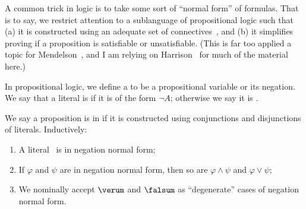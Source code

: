 \begin{node}\label{prop-000P}%
A common trick in logic is to take some sort of ``normal form'' of
formulas. That is to say, we restrict attention to a sublanguage of
propositional logic such that (a) it is constructed using an adequate
set of connectives~, and (b) it simplifies proving if a
proposition is satisfiable or unsatisfiable. (This is far too applied a
topic for Mendelson~\cite{mendelson2015mathematical}, and I am relying on
Harrison~\cite{harrison2009handbook} for much of the material here.)

\begin{definition}\label{prop-000Q}%
In propositional logic, we define a  to be a
propositional variable or its negation. We say that a literal is
 if it is of the form $\neg A$; otherwise we say it is
. 
\end{definition}

\begin{definition}\label{prop-000O}%
We say a proposition is in  if it is
constructed using conjunctions and disjunctions of
literals. Inductively:
\begin{enumerate}
\item A literal~ is in negation normal form;
\item If $\varphi$ and $\psi$ are in negation normal form, then so are
  $\varphi\land\psi$ and $\varphi\lor\psi$;
\item We nominally accept $\verum$ and $\falsum$ as ``degenerate'' cases
  of negation normal form.
\end{enumerate}
\end{definition}


\end{node}
